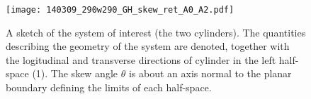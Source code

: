 \documentclass[onecolumn,letterpaper,amsmath,amssymb,floatfix,aps,superscriptaddress]{revtex4}
\begin{document}
\begin{figure}
\centerline{\texttt{[image: 140309\_290w290\_GH\_skew\_ret\_A0\_A2.pdf]}}
\caption{A sketch of the system of interest (the two cylinders). The quantities describing the geometry of the system are 
denoted, together with the logitudinal and transverse directions of cylinder in the left half-space (1). The skew angle $\theta$ is about an axis normal to the planar boundary defining the limits of each half-space.
}
\label{fig:sketch}
\end{figure}
\end{document}
